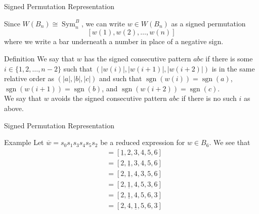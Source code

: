 \documentclass[9pt,handout]{beamer}
\newcommand{\w}{\overline{w}}
\DeclareMathOperator{\sgn}{sgn}
\DeclareMathOperator{\Sym}{Sym}
\begin{document}
\begin{frame}{Signed Permutation Representation}

Since $W(B_n) \cong \Sym_n^B$, we can write $w \in W(B_n)$ as a signed permutation 
\[[w(1), w(2), \ldots, w(n)]\] where we write a bar underneath a number in place of a negative sign.

\pause

\begin{block}{Definition}
	We say that $w$ has the \alert{signed consecutive pattern $abc$} if there is some $i \in \{1,2, \ldots, n-2\}$ such that $\left(|w(i)|, |w(i+1)|, |w(i+2)|\right)$ is in the same relative order as $\left(|a|, |b|, |c| \right)$ and such that $\sgn(w(i))=\sgn(a)$, $\sgn(w(i+1))=\sgn(b)$, and $\sgn(w(i+2))=\sgn(c)$.\\
	\vspace{1em} \pause
	 We say that $w$ \alert{avoids the signed consecutive pattern $abc$} if there is no such $i$ as above.
\end{block}

\end{frame}



\begin{frame}{Signed Permutation Representation}

\begin{block}{Example}
	Let $\w=s_0s_1s_3s_4s_5s_2$ be a reduced expression for $w \in B_6$. We see that
	\begin{align*}
	[1,2,3,4,5,6] &= [\underline{1},2,3,4,5,6]\\
	&=[2,\underline{1},3,4,5,6]\\	
	&=[2,\underline{1},4,3,5,6]\\
	&=[2,\underline{1},4,5,3,6]\\
	&=[2,\underline{1},4,5,6,3]\\
	&=[2,4,\underline{1},5,6,3]
	\end{align*}

\end{block}
	
\end{frame}


\end{document}
